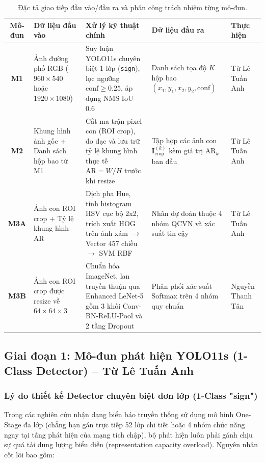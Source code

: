 \documentclass[a4paper, 11pt]{article}
\begin{document}
\begin{table}[H]
\centering
\small
\caption{Đặc tả giao tiếp đầu vào/đầu ra và phân công trách nhiệm từng mô-đun.}
\label{tab:module_io_spec}
\begin{tabularx}{\textwidth}{|c|p{3.2cm}|p{3.8cm}|p{3.2cm}|Y|}
\hline
\textbf{Mô-đun} & \textbf{Dữ liệu đầu vào} & \textbf{Xử lý kỹ thuật chính} & \textbf{Dữ liệu đầu ra} & \textbf{Thực hiện} \\
\hline
\textbf{M1} & Ảnh đường phố RGB ($960\times 540$ hoặc $1920\times 1080$) & Suy luận YOLO11s chuyên biệt 1-lớp (\texttt{sign}), lọc ngưỡng $\text{conf} \ge 0.25$, áp dụng NMS IoU $0.6$ & Danh sách tọa độ $K$ hộp bao $(x_1, y_1, x_2, y_2, \text{conf})$ & Từ Lê Tuấn Anh \\
\hline
\textbf{M2} & Khung hình ảnh gốc + Danh sách hộp bao từ M1 & Cắt ma trận pixel con (ROI crop), đo đạc và lưu trữ tỷ lệ khung hình thực tế $\text{AR} = W/H$ trước khi resize & Tập hợp các ảnh con $\mathbf{I}^{(k)}_{\text{crop}}$ kèm giá trị $\text{AR}_k$ ban đầu & Từ Lê Tuấn Anh \\
\hline
\textbf{M3A} & Ảnh con ROI crop + Tỷ lệ khung hình $\text{AR}$ & Dịch pha Hue, tính histogram HSV cục bộ 2x2, trích xuất HOG trên ảnh xám $\rightarrow$ Vector 457 chiều $\rightarrow$ SVM RBF & Nhãn dự đoán thuộc 4 nhóm QCVN và xác suất tin cậy & Từ Lê Tuấn Anh \\
\hline
\textbf{M3B} & Ảnh con ROI crop được resize về $64\times 64\times 3$ & Chuẩn hóa ImageNet, lan truyền thuận qua Enhanced LeNet-5 gồm 3 khối Conv-BN-ReLU-Pool và 2 tầng Dropout & Phân phối xác suất Softmax trên 4 nhóm quy chuẩn & Nguyễn Thanh Tân \\
\hline
\end{tabularx}
\end{table}

\subsection{Giai đoạn 1: Mô-đun phát hiện YOLO11s (1-Class Detector) -- Từ Lê Tuấn Anh}
\label{subsec:stage1_yolo}

\subsubsection{Lý do thiết kế Detector chuyên biệt đơn lớp (1-Class "sign")}
\label{subsubsec:why_one_class}

Trong các nghiên cứu nhận dạng biển báo truyền thống sử dụng mô hình One-Stage đa lớp (chẳng hạn gán trực tiếp 52 lớp chi tiết hoặc 4 nhóm chức năng ngay tại tầng phát hiện của mạng tích chập), bộ phát hiện luôn phải gánh chịu sự quá tải dung lượng biểu diễn (representation capacity overload). Nguyên nhân cốt lõi bao gồm:
\end{document}
